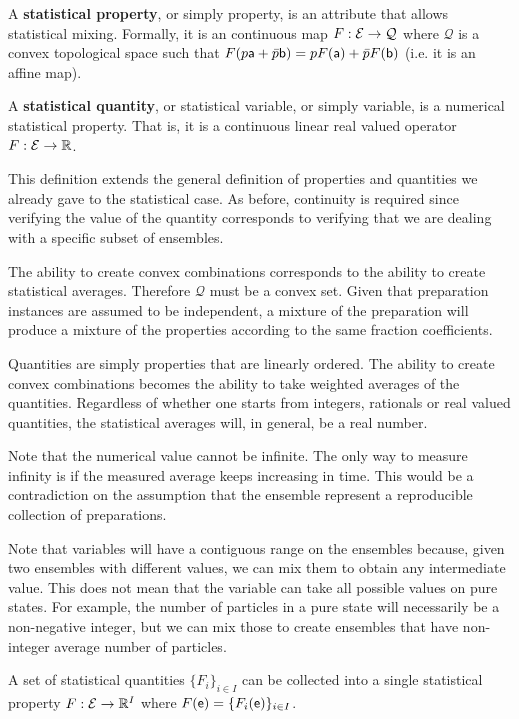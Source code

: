 \begin{mathSection}
	
\begin{defn}
	A \textbf{statistical property}, or simply property, is an attribute that allows statistical mixing. Formally, it is an continuous map $F : \Ens \to \mathcal{Q}$ where $\mathcal{Q}$ is a convex topological space such that $F(p \ens[a] + \bar{p} \ens[b]) = p F(\ens[a]) + \bar{p} F(\ens[b])$ (i.e. it is an affine map).
	
	A \textbf{statistical quantity}, or statistical variable, or simply variable, is a numerical statistical property. That is, it is a continuous linear real valued operator $F : \Ens \to \mathbb{R}$.
\end{defn}

\begin{justification}
	This definition extends the general definition of properties and quantities we already gave to the statistical case. As before, continuity is required since verifying the value of the quantity corresponds to verifying that we are dealing with a specific subset of ensembles.
	
	The ability to create convex combinations corresponds to the ability to create statistical averages. Therefore $\mathcal{Q}$ must be a convex set. Given that preparation instances are assumed to be independent, a mixture of the preparation will produce a mixture of the properties according to the same fraction coefficients.
	
	Quantities are simply properties that are linearly ordered. The ability to create convex combinations becomes the ability to take weighted averages of the quantities. Regardless of whether one starts from integers, rationals or real valued quantities, the statistical averages will, in general, be a real number.
	
	Note that the numerical value cannot be infinite. The only way to measure infinity is if the measured average keeps increasing in time. This would be a contradiction on the assumption that the ensemble represent a reproducible collection of preparations.
\end{justification}

\begin{remark}
	Note that variables will have a contiguous range on the ensembles because, given two ensembles with different values, we can mix them to obtain any intermediate value. This does not mean that the variable can take all possible values on pure states. For example, the number of particles in a pure state will necessarily be a non-negative integer, but we can mix those to create ensembles that have non-integer average number of particles.
\end{remark}

\begin{coro}
	A set of statistical quantities $\{F_i\}_{i \in I}$ can be collected into a single statistical property $F : \Ens \to \mathbb{R}^I$ where $F(\ens) = \{F_i(\ens)\}_{i \in I}$.
\end{coro}
\end{mathSection}

